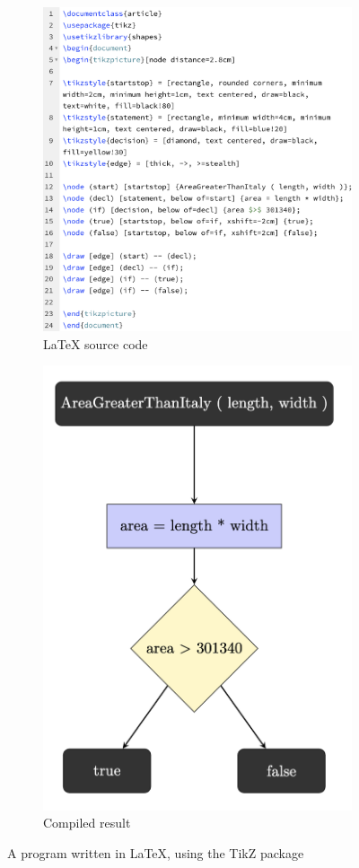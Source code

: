 \begin{figure}[ht]
\centering
\begin{subfigure}{.7\textwidth}
  \centering
  \includegraphics[width=1\linewidth]{assets/AGTI_IBP_s.png}
  \caption{LaTeX source code}
  \label{fig:AGTI_IBP_source_code}
\end{subfigure} \newline

\begin{subfigure}{.4\textwidth}
  \centering
  \includegraphics[width=.4\linewidth]{assets/AGTI_IBP.png}
  \caption{Compiled result}
  \label{fig:AGTI_IBP_result}
\end{subfigure}
\caption{A program written in LaTeX, using the TikZ package}
\label{fig:AGTI_IBP}
\end{figure}

